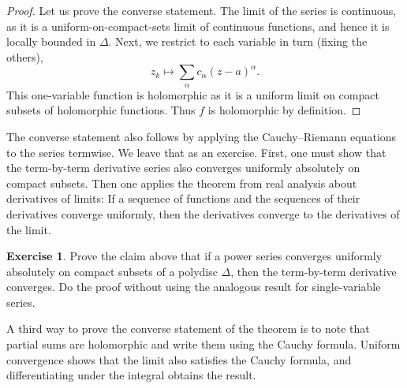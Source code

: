 \documentclass[12pt,openany]{book}
\theoremstyle{plain}
\theoremstyle{remark}
\theoremstyle{definition}
\newenvironment{exbox}{%
    \def\FrameCommand{\vrule width 1pt \relax\hspace{10pt}}%
    \MakeFramed{\advance\hsize-\width\FrameRestore}%
}{%
    \endMakeFramed
}
\theoremstyle{exercise}
\newtheorem{exercise}{Exercise}[section]
\theoremstyle{example}
\begin{document}
\begin{proof}
Let us prove the converse statement.
The limit of the series
is continuous, as it is a uniform-on-compact-sets limit of continuous
functions, and hence it is locally bounded in $\Delta$.  Next,
we restrict to each variable in turn (fixing the others),
\begin{equation*}
z_k \mapsto \sum_{\alpha} c_\alpha {(z-a)}^\alpha .
\end{equation*}
This one-variable function is holomorphic as it is a uniform limit on compact subsets of
holomorphic functions.  Thus $f$ is holomorphic by definition.
\end{proof}

The converse statement also follows by applying the Cauchy--Riemann
equations to the series termwise.
We leave that as an exercise.
First, one must show that the term-by-term derivative
series also converges uniformly absolutely on compact subsets.
Then one applies the theorem from real analysis about derivatives
of limits: If a sequence of functions and the sequences of their derivatives converge
uniformly, then the derivatives converge to the derivatives of the limit.

\begin{exbox}
\begin{exercise}
Prove the claim above that if a power series converges uniformly absolutely
on compact subsets of a polydisc $\Delta$, then the term-by-term derivative
converges.
Do the proof without using the analogous result for single-variable series.
\end{exercise}
\end{exbox}

\pagebreak[1]
A third way to prove the converse statement of the theorem
is to note that partial sums are
holomorphic and write them using the Cauchy formula.  Uniform
convergence shows that the limit also satisfies the Cauchy formula, and
differentiating under the integral obtains the result.
\end{document}

